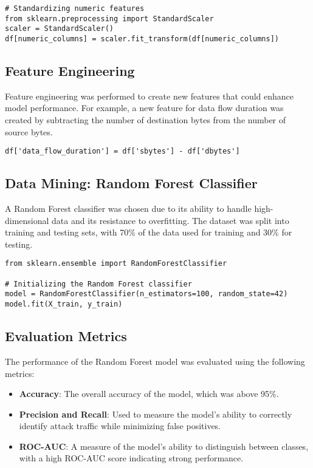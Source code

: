 \documentclass[12pt]{article}
\begin{document}
\begin{verbatim}
# Standardizing numeric features
from sklearn.preprocessing import StandardScaler
scaler = StandardScaler()
df[numeric_columns] = scaler.fit_transform(df[numeric_columns])
\end{verbatim}

\subsection{Feature Engineering}
Feature engineering was performed to create new features that could enhance model performance. For example, a new feature for data flow duration was created by subtracting the number of destination bytes from the number of source bytes.

\begin{verbatim}
df['data_flow_duration'] = df['sbytes'] - df['dbytes']
\end{verbatim}

\subsection{Data Mining: Random Forest Classifier}
A Random Forest classifier was chosen due to its ability to handle high-dimensional data and its resistance to overfitting. The dataset was split into training and testing sets, with 70\% of the data used for training and 30\% for testing.

\begin{verbatim}
from sklearn.ensemble import RandomForestClassifier

# Initializing the Random Forest classifier
model = RandomForestClassifier(n_estimators=100, random_state=42)
model.fit(X_train, y_train)
\end{verbatim}

\subsection{Evaluation Metrics}
The performance of the Random Forest model was evaluated using the following metrics:

\begin{itemize}
    \item \textbf{Accuracy}: The overall accuracy of the model, which was above 95\%.
    \item \textbf{Precision and Recall}: Used to measure the model’s ability to correctly identify attack traffic while minimizing false positives.
    \item \textbf{ROC-AUC}: A measure of the model’s ability to distinguish between classes, with a high ROC-AUC score indicating strong performance.
\end{itemize}
\end{document}
